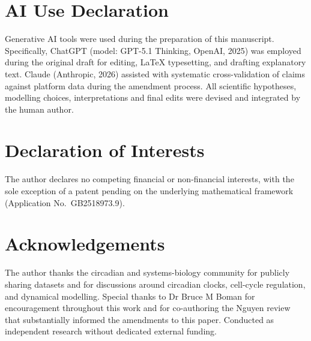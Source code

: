 \documentclass[11pt,letterpaper]{article}
\theoremstyle{definition}
\theoremstyle{remark}
\begin{document}
\section{AI Use Declaration}

Generative AI tools were used during the preparation of this manuscript. Specifically, ChatGPT (model: GPT-5.1 Thinking, OpenAI, 2025) was employed during the original draft for editing, LaTeX typesetting, and drafting explanatory text. Claude (Anthropic, 2026) assisted with systematic cross-validation of claims against platform data during the amendment process. All scientific hypotheses, modelling choices, interpretations and final edits were devised and integrated by the human author.

\section{Declaration of Interests}

The author declares no competing financial or non-financial interests, with the sole exception of a patent pending on the underlying mathematical framework (Application No.\ GB2518973.9).

\section*{Acknowledgements}

The author thanks the circadian and systems-biology community for publicly sharing datasets and for discussions around circadian clocks, cell-cycle regulation, and dynamical modelling. Special thanks to Dr Bruce M Boman for encouragement throughout this work and for co-authoring the Nguyen review that substantially informed the amendments to this paper. Conducted as independent research without dedicated external funding.
\end{document}
